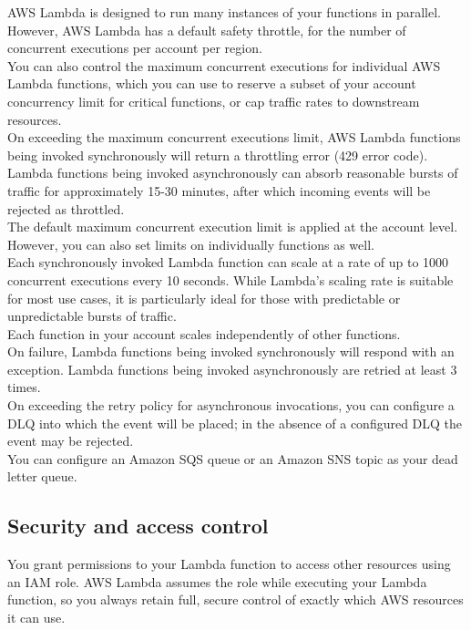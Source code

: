 \documentclass[12pt, letterpaper, twoside]{article}
\begin{document}
AWS Lambda is designed to run many instances of your functions in parallel. However, AWS Lambda has a default safety throttle, 
for the number of concurrent executions per account per region.\\ 
You can also control the maximum concurrent executions for individual AWS Lambda functions, which you can use to reserve a 
subset of your account concurrency limit for critical functions, or cap traffic rates to downstream resources.\\

On exceeding the maximum concurrent executions limit, AWS Lambda functions being invoked synchronously will return a 
throttling error (429 error code). Lambda functions being invoked asynchronously can absorb reasonable bursts of traffic 
for approximately 15-30 minutes, after which incoming events will be rejected as throttled.\\

The default maximum concurrent execution limit is applied at the account level. However, you can also set limits on 
individually functions as well.\\

Each synchronously invoked Lambda function can scale at a rate of up to 1000 concurrent executions every 10 seconds. While 
Lambda's scaling rate is suitable for most use cases, it is particularly ideal for those with predictable or unpredictable 
bursts of traffic.\\
Each function in your account scales independently of other functions.\\

On failure, Lambda functions being invoked synchronously will respond with an exception. Lambda functions being invoked 
asynchronously are retried at least 3 times.\\

On exceeding the retry policy for asynchronous invocations, you can configure a DLQ into which the event will be placed; 
in the absence of a configured DLQ the event may be rejected.\\
You can configure an Amazon SQS queue or an Amazon SNS topic as your dead letter queue.	\\

\subsection{Security and access control}
You grant permissions to your Lambda function to access other resources using an IAM role. AWS Lambda assumes the role while 
executing your Lambda function, so you always retain full, secure control of exactly which AWS resources it can use.\\
\end{document}
